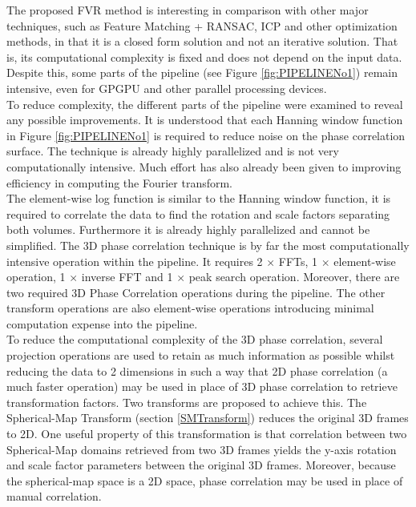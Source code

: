 
The proposed FVR method is interesting in comparison with other major techniques, such as Feature Matching + RANSAC, ICP and other optimization methods, in that it is a closed form solution and not an iterative solution. That is, its computational complexity is fixed and does not depend on the input data. Despite this, some parts of the pipeline (see Figure \ref{fig:PIPELINENo1}) remain intensive, even for GPGPU and other parallel processing devices. \\

To reduce complexity, the different parts of the pipeline were examined to reveal any possible improvements. It is understood that each Hanning window function in Figure \ref{fig:PIPELINENo1} is required to reduce noise on the phase correlation surface. The technique is already highly parallelized and is not very computationally intensive. Much effort has also already been given to improving efficiency in computing the Fourier transform. \\

The element-wise log function is similar to the Hanning window function, it is required to correlate the data to find the rotation and scale factors separating both volumes. Furthermore it is already highly parallelized and cannot be simplified. The 3D phase correlation technique is by far the most computationally intensive operation within the pipeline. It requires 2 $\times$ FFTs, 1 $\times$ element-wise operation, 1 $\times$ inverse FFT and 1 $\times$ peak search operation. Moreover, there are two required 3D Phase Correlation operations during the pipeline. The other transform operations are also element-wise operations introducing minimal computation expense into the pipeline. \\

To reduce the computational complexity of the 3D phase correlation, several projection operations are used to retain as much information as possible whilst reducing the data to 2 dimensions in such a way that 2D phase correlation (a much faster operation) may be used in place of 3D phase correlation to retrieve transformation factors. Two transforms are proposed to achieve this. The Spherical-Map Transform (section \ref{SMTransform}) reduces the original 3D frames to 2D. One useful property of this transformation is that correlation between two Spherical-Map domains retrieved from two 3D frames yields the y-axis rotation and scale factor parameters between the original 3D frames. Moreover, because the spherical-map space is a 2D space, phase correlation may be used in place of manual correlation.  \\

